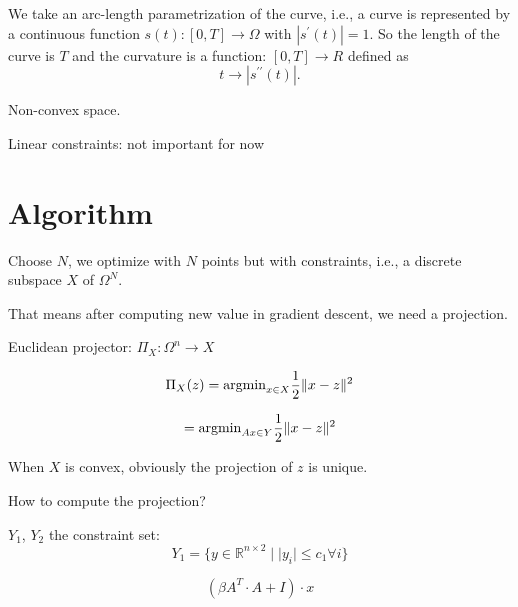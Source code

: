 \documentclass[11pt]{article}
\begin{document}
We take an arc-length parametrization of the curve, i.e., a curve is
represented by a continuous function $s(t) : [0,T] \to \Omega$ with $|
s^{\prime}(t) | = 1$. So the length of the curve is $T$ and the
curvature is a function: $[0,T] \to R$ defined as
\[t \to | s^{\prime \prime}(t) |.\]



Non-convex space.

Linear constraints: not important for now

\section{Algorithm}
Choose $N$, we optimize with $N$ points but with
constraints, i.e., a discrete subspace $X$ of $\Omega^N$.

That means after computing new value in gradient descent, we need a projection.

Euclidean projector: $\Pi_{X} : \Omega^n \to X$

\[\Pi_{X}(z) = {\rm argmin}_{x \in X} \frac{1}{2} \| x - z \|^2 \]

\[ = {\rm argmin}_{Ax \in Y} \frac{1}{2} \| x - z \|^2 \]

When $X$ is convex, obviously the projection of $z$ is unique.

How to compute the projection?

$Y_1$, $Y_2$ the constraint set:
\[Y_1 = \{ y \in \mathbb{R}^{n \times 2} \; | \; |y_i| \leq c_1 \forall i \}\]


\[(\beta A^T \cdot A + I) \cdot x \]
\end{document}
